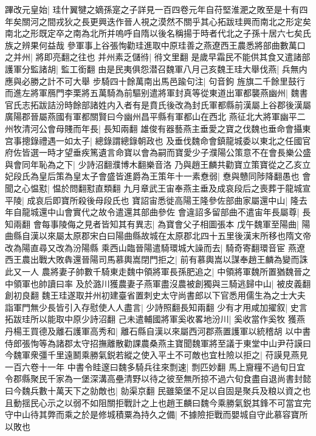 蹕改元皇始|{
	珪什翼犍之嫡孫寔之子詳見一百四卷元年自苻堅淮淝之敗至是十有四年矣關河之間戎狄之長更興迭作晉人視之漠然不關乎其心拓跋珪興而南北之形定矣南北之形既定卒之南為北所并嗚呼自隋以後名稱揚于時者代北之子孫十居六七矣氏族之辨果何益哉}
參軍事上谷張恂勸珪進取中原珪善之燕遼西王農悉將部曲數萬口之并州|{
	將即亮翻之往也}
并州素乏儲㣥|{
	㣥文里翻}
是歲早霜民不能供其食又遣諸部護軍分監諸胡|{
	監工銜翻}
由是民夷俱怨潜召魏軍八月己亥魏王珪大舉伐燕|{
	兵無内應與必勝之計不可大舉}
步騎四十餘萬南出馬邑踰句注|{
	句音鉤}
旌旗二千餘里鼓行而進左將軍鴈門李栗將五萬騎為前驅别遣將軍封真等從東道出軍都襲燕幽州|{
	魏書官氏志拓跋詰汾時餘部諸姓内入者有是賁氏後改為封氏軍都縣前漢屬上谷郡後漢屬廣陽郡晉屬燕國有軍都關賢曰今幽州昌平縣有軍都山在西北}
燕征北大將軍幽平二州牧清河公會母賤而年長|{
	長知兩翻}
雄俊有器藝燕主垂愛之寶之伐魏也垂命會攝東宫事摠錄禮遇一如太子|{
	總錄謂總錄朝政也}
及垂伐魏命會鎮龍城委以東北之任國官府佐皆選一時才望垂疾篤遺言命寶以會為嗣而寶愛少子濮陽公策意不在會長樂公盛與會同年恥為之下|{
	少詩沼翻濮博木翻樂音洛}
乃與趙王麟共勸寶立策寶從之乙亥立妃段氏為皇后策為皇太子會盛皆進爵為王策年十一素憃弱|{
	憃與戇同陟降翻愚也}
會聞之心愠懟|{
	愠於問翻懟直類翻}
九月章武王宙奉燕主垂及成哀段后之喪葬于龍城宣平陵|{
	成哀后即寶所殺後母段氏也}
寶詔宙悉徙高陽王隆參佐部曲家屬還中山|{
	隆去年自龍城還中山會實代之故令遣還其部曲參佐}
會違詔多留部曲不遣宙年長屬尊|{
	長知兩翻}
會每事陵侮之見者皆知其有異志|{
	為寶會父子相圖張本}
戊午魏軍至陽曲|{
	陽曲縣自漢以來屬太原郡宋白曰陽曲縣故城在太原郡北四十五里後漢末所移也隋文帝改為陽直尋又改為汾陽縣}
乘西山臨晉陽遣騎環城大譟而去|{
	騎奇寄翻環音宦}
燕遼西王農出戰大敗犇還晉陽司馬慕輿嵩閉門拒之|{
	前有慕輿嵩以謀奉趙王麟為變而誅此又一人}
農將妻子帥數千騎東走魏中領將軍長孫肥追之|{
	中領將軍魏所置猶魏晉之中領軍也帥讀曰率}
及於潞川獲農妻子燕軍盡沒農被創獨與三騎逃歸中山|{
	被皮義翻創初良翻}
魏王珪遂取并州初建臺省置刺史太守尚書郎以下官悉用儒生為之士大夫詣軍門無少長皆引入存慰使人人盡言|{
	少詩照翻長知兩翻}
少有才用咸加擢叙|{
	史言拓跋珪所以能取中原少詩沼翻}
己未遣輔國將軍奚收畧地汾川|{
	奚收當作奚牧}
獲燕丹楊王買德及離石護軍高秀和|{
	離石縣自漢以來屬西河郡燕置護軍以統稽胡}
以中書侍郎張恂等為諸郡太守招撫離散勸課農桑燕主寶聞魏軍將至議于東堂中山尹苻謨曰今魏軍衆彊千里遠鬭乘勝氣鋭若縱之使入平土不可敵也宜杜險以拒之|{
	苻謨見燕見一百六卷十一年}
中書令眭邃曰魏多騎兵往來剽速|{
	剽匹妙翻}
馬上齎糧不過旬日宜令郡縣聚民千家為一堡深溝高壘清野以待之彼至無所掠不過六旬食盡自退尚書封懿曰今魏兵數十萬天下之勍敵也|{
	勍渠京翻}
民雖築堡不足以自固是聚兵及粮以資之也且動揺民心示之以弱不如阻關拒戰計之上也趙王麟曰魏今乘勝氣鋭其鋒不可當宜完守中山待其弊而乘之於是修城積粟為持久之備|{
	不據險拒戰而嬰城自守此慕容寶所以敗也}
